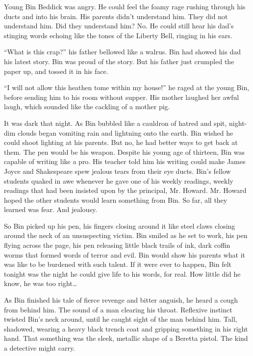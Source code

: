 Young Bin Beddick was angry. He could feel the foamy rage rushing
through his ducts and into his brain. His parents didn't
understand him. They did not understand him. Did they understand
him? No. He could still hear his dad's stinging words echoing
like the tones of the Liberty Bell, ringing in his ears.

``What is this crap?'' his father bellowed like a walrus.
Bin had showed his dad his latest story. Bin was proud of the
story. But his father just crumpled the paper up, and tossed it in
his face.

``I will not allow this heathen tome within my house!''
he raged at the young Bin, before sending him to his room without
supper. His mother laughed her awful laugh, which sounded like the
cackling of a mother pig.

It was dark that night. As Bin bubbled like a cauldron of hatred
and spit, night-dim clouds began vomiting rain and lightning onto
the earth. Bin wished he could shoot lighting at his parents. But
no, he had better ways to get back at them. The pen would be his
weapon. Despite his young age of thirteen, Bin was capable of
writing like a pro. His teacher told him his writing could make
James Joyce and Shakespeare spew jealous tears from their eye
ducts. Bin's fellow students quaked in awe whenever he gave
one of his weekly readings, weekly readings that had been insisted
upon by the principal, Mr. Howard. Mr. Howard hoped the other
students would learn something from Bin. So far, all they learned
was fear. And jealousy.

So Bin picked up his pen, his fingers closing around it like steel
claws closing around the neck of an unsuspecting victim. Bin smiled
as he set to work, his pen flying across the page, his pen
releasing little black trails of ink, dark coffin worms that formed
words of terror and evil. Bin would show his parents what it was
like to be burdened with such talent. If it were ever to happen,
Bin felt tonight was the night he could give life to his words, for
real. How little did he know, he was too right{\ldots}

As Bin finished his tale of fierce revenge and bitter anguish, he
heard a cough from behind him. The sound of a man clearing his
throat. Reflexive instinct twisted Bin's neck around, until
he caught sight of the man behind him. Tall, shadowed, wearing a
heavy black trench coat and gripping something in his right hand.
That something was the sleek, metallic shape of a Beretta pistol.
The kind a detective might carry.


